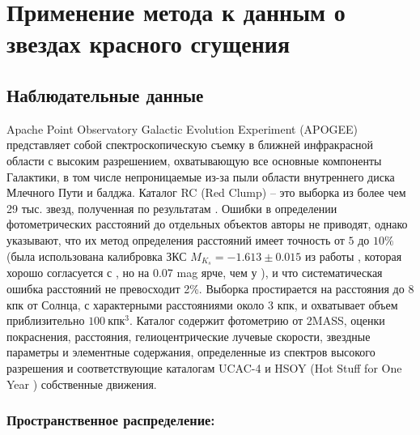\documentclass{matmex-diploma-custom}
\begin{document}
\section{Применение метода к данным о звездах красного сгущения}
\subsection{Наблюдательные данные}
Apache Point Observatory Galactic Evolution Experiment (APOGEE) \cite{APOGEE} представляет собой спектроскопическую съемку в ближней инфракрасной области с высоким разрешением, охватывающую все основные компоненты Галактики, в том числе непроницаемые из-за пыли области внутреннего диска Млечного Пути и балджа. Каталог RC (Red Clump) \cite{DRdata} \cite{DRdecs} -- это выборка из более чем 29 тыс. звезд, полученная по результатам \cite{Bovy}. Ошибки в определении фотометрических расстояний до отдельных объектов авторы не приводят, однако указывают, что их метод определения расстояний имеет точность от $5$ до $10\%$ (была использована калибровка ЗКС $M_{K_s} = -1.613 \pm 0.015 $ из работы \cite{Laney}, которая хорошо согласуется с \cite{Alves}, но на 0.07 mag ярче, чем у \cite{Groenewegen}), и что систематическая ошибка расстояний не превосходит 2\%. Выборка простирается на расстояния до 8 кпк от Солнца, с характерными расстояниями около 3 кпк, и охватывает объем приблизительно $100 ~\textrm{кпк}^3$.  Каталог содержит фотометрию от 2MASS, оценки покраснения, расстояния, гелиоцентрические лучевые скорости, звездные параметры и элементные содержания, определенные из спектров высокого разрешения и соответствующие каталогам UCAC-4 \cite{UCAC4} и HSOY (Hot Stuff for One Year \cite{HSOY}) собственные движения. 

\subsubsection*{Пространственное распределение:}
\end{document}
